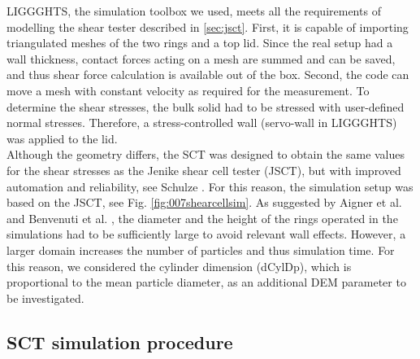 
\acs{LIGGGHTS}, the simulation toolbox we used, meets all the requirements of
modelling the shear tester described in \ref{sec:jsct}. 
First, it is capable of importing triangulated meshes of the two rings and a top lid. 
Since the real setup had a wall thickness, contact forces acting on a mesh are summed and can be saved, 
and thus shear force calculation is available out of the box. 
Second, the code can move a mesh with constant 
velocity as required for the measurement. 
To determine the shear stresses, the bulk solid had to be stressed with 
user-defined normal stresses. 
Therefore, a stress-controlled wall (servo-wall in \acs{LIGGGHTS}) was applied to the lid. \\
Although the geometry differs, the \acs{SCT} was designed to obtain the same values for the shear stresses as the 
Jenike shear cell tester (\acs{JSCT}), but with improved automation and reliability,
see Schulze \cite{RefWorks:118}. 
For this reason, the simulation setup was
based on the \acs{JSCT}, see Fig. \ref{fig:007shearcellsim}.
As suggested by Aigner et al. \cite{RefWorks:139} and Benvenuti et al. \cite{RefWorks:173}, 
the diameter and the height of the rings operated in the simulations had to be sufficiently large to avoid relevant wall effects. 
However, a larger domain increases the number of particles and thus
simulation time.
For this reason, we considered the cylinder dimension (\acs{dCylDp}), which is
proportional to the mean particle diameter, as an additional \acs{DEM}
parameter to be investigated.

\subsection{SCT simulation procedure}
\label{subsec:scsimulation}

